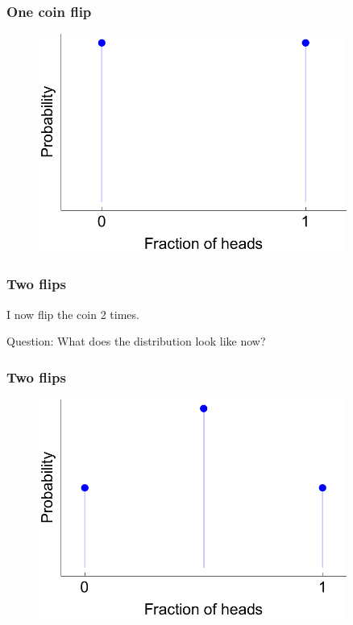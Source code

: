 \documentclass{beamer}
\begin{document}
	\begin{frame}
		\frametitle{One coin flip}
		
		\begin{figure}[ht]
			\centerline{\includegraphics[width=0.9\textwidth]{./figures/binomial_1.pdf}}
		\end{figure}
		
	\end{frame}
	
	\begin{frame}
		\frametitle{Two flips}
		I now flip the coin 2 times.
		
		\vspace{0.5cm}
		
		Question: What does the distribution look like now?
		
	\end{frame}
	
	\begin{frame}
		\frametitle{Two flips}
		
		\begin{figure}[ht]
			\centerline{\includegraphics[width=0.9\textwidth]{./figures/binomial_2.pdf}}
		\end{figure}
		
	\end{frame}
	
\end{document}
